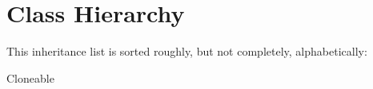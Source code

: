 \section{Class Hierarchy}
This inheritance list is sorted roughly, but not completely, alphabetically\+:\begin{DoxyCompactList}
\item Cloneable\begin{DoxyCompactList}
\item {}
\begin{DoxyCompactList}
\item {}
\item {}
\end{DoxyCompactList}
\end{DoxyCompactList}
\item {}
\item {}
\end{DoxyCompactList}
